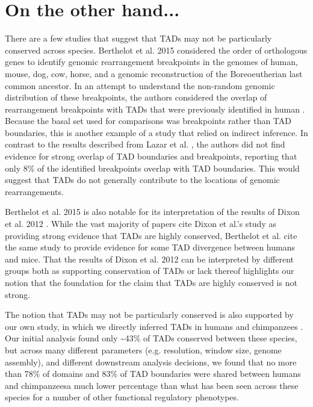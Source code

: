 \section{On the other hand...}
There are a few studies that suggest that TADs may not be particularly conserved across species. Berthelot et al. 2015 \cite{Berthelot.2015} considered the order of orthologous genes to identify genomic rearrangement breakpoints in the genomes of human, mouse, dog, cow, horse, and a genomic reconstruction of the Boreoeutherian last common ancestor. In an attempt to understand the non-random genomic distribution of these breakpoints, the authors considered the overlap of rearrangement breakpoints with TADs that were previously identified in human \cite{Dixon.2012}. Because the basal set used for comparisons was breakpoints rather than TAD boundaries, this is another example of a study that relied on indirect inference. In contrast to the results described from Lazar et al. \cite{Lazar.2018}, the authors did not find evidence for strong overlap of TAD boundaries and breakpoints, reporting that only 8\% of the identified breakpoints overlap with TAD boundaries. This would suggest that TADs do not generally contribute to the locations of genomic rearrangements.

Berthelot et al. 2015 \cite{Berthelot.2015} is also notable for its interpretation of the results of Dixon et al. 2012 \cite{Dixon.2012}. While the vast majority of papers cite Dixon et al.'s study as providing strong evidence that TADs are highly conserved, Berthelot et al. cite the same study to provide evidence for some TAD divergence between humans and mice. That the results of Dixon et al. 2012 can be interpreted by different groups both as supporting conservation of TADs or lack thereof highlights our notion that the foundation for the claim that TADs are highly conserved is not strong.

The notion that TADs may not be particularly conserved is also supported by our own study, in which we directly inferred TADs in humans and chimpanzees \cite{Eres.2019}. Our initial analysis found only \textasciitilde{}43\% of TADs conserved between these species, but across many different parameters (e.g. resolution, window size, genome assembly), and different downstream analysis decisions, we found that no more than 78\% of domains and 83\% of TAD boundaries were shared between humans and chimpanzees{\textemdash}a much lower percentage than what has been seen across these species for a number of other functional regulatory phenotypes.

